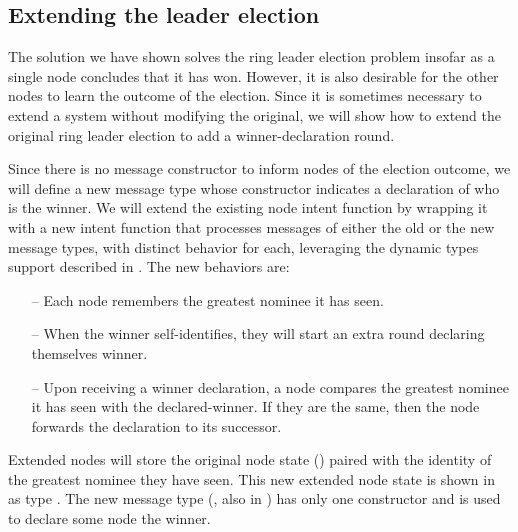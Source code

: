 \documentclass[sigplan,screen]{acmart}
\begin{document}
\subsection{Extending the leader election}
\label{sec:dyn-ring}

The solution we have shown solves the ring leader election problem
insofar as a single node concludes that it has won.
%
However, it is also desirable for the other nodes to learn the outcome of the
election.
%
Since it is sometimes necessary to extend a system without modifying the
original, we will show how to extend the original ring leader election to add a
winner-declaration round.

Since there is no message constructor to inform nodes of the election outcome,
we will define a new message type whose constructor indicates a declaration of
who is the winner.
%
We will extend the existing node intent function by wrapping it with a new
intent function that processes messages of either the old or the new message
types, with distinct behavior for each, leveraging the dynamic types support
described in .
%
The new behaviors are:
%
\begin{itemize}[leftmargin=1.5em]
    \item[--] Each node remembers the greatest nominee it has seen.

    \item[--] When the winner self-identifies, they will start an extra round
    declaring themselves winner.

    \item[--] Upon receiving a winner declaration, a node compares the greatest
    nominee it has seen with the declared-winner.
    If they are the same, then the node forwards the declaration to its
    successor.
\end{itemize}

Extended nodes will store the original node state ()
paired with the identity of the greatest nominee they have seen.
%
This new extended node state is shown in  as type
.
%
The new message type (, also in ) has only
one constructor and is used to declare some node the winner.
\end{document}
